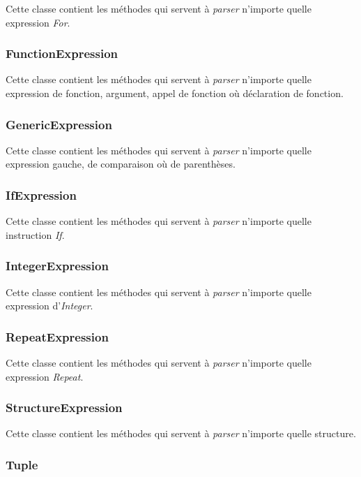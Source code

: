 Cette classe contient les méthodes qui servent à \emph{parser} n'importe quelle expression \emph{For}.

\subsubsection{FunctionExpression}

Cette classe contient les méthodes qui servent à \emph{parser} n'importe quelle expression de fonction, argument, appel de fonction où déclaration de fonction.

\subsubsection{GenericExpression}

Cette classe contient les méthodes qui servent à \emph{parser} n'importe quelle expression gauche, de comparaison où de parenthèses.

\subsubsection{IfExpression}

Cette classe contient les méthodes qui servent à \emph{parser} n'importe quelle instruction \emph{If}.

\subsubsection{IntegerExpression}

Cette classe contient les méthodes qui servent à \emph{parser} n'importe quelle expression d'\emph{Integer}.

\subsubsection{RepeatExpression}

Cette classe contient les méthodes qui servent à \emph{parser} n'importe quelle expression \emph{Repeat}.

\subsubsection{StructureExpression}

Cette classe contient les méthodes qui servent à \emph{parser} n'importe quelle structure.

\subsubsection{Tuple}

